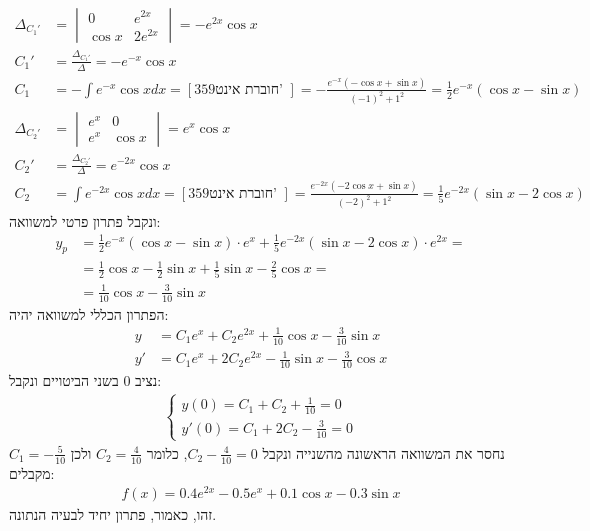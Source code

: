 \documentclass{article}
\begin{document}
\begin{align*}
    \Delta_{C_1'} & = \begin{vmatrix}
                          0      & e^{2x}  \\
                          \cos x & 2e^{2x}
                      \end{vmatrix} = -e^{2x}\cos x                                                                                                            \\
    C_1'          & =\frac{\Delta_{C_1'}}{\Delta} = -e^{-x}\cos x                                                                                              \\
    C_1           & = -\int e^{-x}\cos x dx = [359 \text{חוברת אינט' }] = - \frac{e^{-x}(-\cos x + \sin x)}{(-1)^2+1^2}=\frac{1}{2}e^{-x}(\cos x - \sin x)     \\
    \Delta_{C_2'} & = \begin{vmatrix}
                          e^x & 0      \\
                          e^x & \cos x
                      \end{vmatrix} = e^x\cos x                                                                                                                \\
    C_2'          & = \frac{\Delta_{C_2'}}{\Delta} = e^{-2x}\cos x                                                                                             \\
    C_2           & = \int e^{-2x}\cos x dx = [359 \text{חוברת אינט' }] = \frac{e^{-2x}(-2\cos x + \sin x)}{(-2)^2+1^2} = \frac{1}{5}e^{-2x}(\sin x - 2\cos x)
\end{align*}
ונקבל פתרון פרטי למשוואה:
\begin{align*}
    y_p & = \frac{1}{2}e^{-x}(\cos x - \sin x) \cdot e^x + \frac{1}{5}e^{-2x}(\sin x - 2\cos x) \cdot e^{2x} = \\
        & = \frac{1}{2}\cos x - \frac{1}{2} \sin x + \frac {1}{5}\sin x - \frac{2}{5}\cos x =                  \\
        & = \frac{1}{10}\cos x - \frac{3}{10}\sin x
\end{align*}
הפתרון הכללי למשוואה יהיה:
\begin{align*}
    y  & =C_1e^x+C_2e^{2x}+\frac{1}{10}\cos x - \frac{3}{10}\sin x       \\
    y' & = C_1e^x + 2C_2e^{2x} - \frac{1}{10}\sin x - \frac{3}{10}\cos x
\end{align*}
נציב 0 בשני הביטויים ונקבל:
\begin{align*}
    \begin{cases}
        y(0)=C_1+C_2+\frac{1}{10} = 0 \\
        y'(0)=C_1+2C_2-\frac{3}{10}=0
    \end{cases}
\end{align*}
נחסר את המשוואה הראשונה מהשנייה ונקבל $C_2-\frac{4}{10}=0$, כלומר $C_2=\frac{4}{10}$ ולכן $C_1=-\frac{5}{10}$
מקבלים:
\begin{align*}
    f(x)=0.4e^{2x}-0.5e^x+0.1\cos x - 0.3 \sin x
\end{align*}
זהו, כאמור, פתרון יחיד לבעיה הנתונה.
\end{document}
